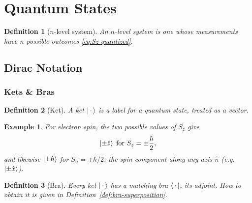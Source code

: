 \documentclass{article}
\newtheorem{definition}{Definition}
\newtheorem*{example}{Example}
\begin{document}
\section{Quantum States}
\label{sec:states}
\begin{definition}[$n$-level system]
    An $n$-level system is one whose measurements have $n$ possible outcomes \eqref{eq:Sz-quantized}.
\end{definition}

\subsection{Dirac Notation}
\subsubsection{Kets \& Bras}
\begin{definition}[Ket]
    \label{def:ket}
    A ket $\ket{\,\cdot\,}$ is a label for a quantum state, treated as a vector.
\end{definition}
\begin{example}
    For electron spin, the two possible values of $S_z$ give
    \[\ket{\pm\hat{z}} \; \text{for } S_{z} = \pm\frac{\hbar}{2},\]
    and likewise $\ket{\pm\hat{n}}$ for $S_n = \pm\hbar/2$, the spin component along any axis $\hat{n}$ (e.g.\ $\ket{\pm\hat{x}}$).
\end{example}
\begin{definition}[Bra]
    Every ket $\ket{\,\cdot\,}$ has a matching bra $\bra{\,\cdot\,}$, its adjoint. How to obtain it is given in Definition~\ref{def:bra-superposition}.
\end{definition}
\end{document}

